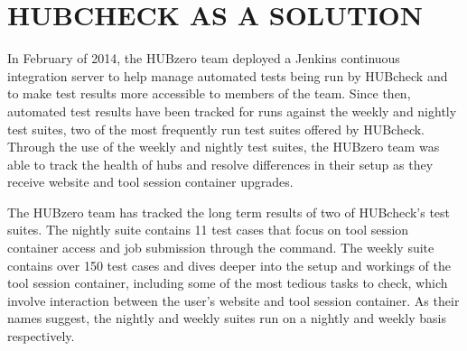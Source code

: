 



\chapter{HUBCHECK AS A SOLUTION}
\label{chap:solution}

In February of 2014, the HUBzero team deployed a Jenkins
\cite{Jenkins:2015:Online} continuous integration server to help manage
automated tests being run by HUBcheck and to make test results more accessible
to members of the team. Since then, automated test results have been tracked
for runs against the weekly and nightly test suites, two of the most frequently run test
suites offered by HUBcheck. Through the use of the weekly and nightly test
suites, the HUBzero team was able to track the health of hubs and resolve
differences in their setup as they receive website and tool session container
upgrades.

The HUBzero team has tracked the long term results of two of HUBcheck's test
suites. The nightly suite contains 11 test cases that focus on tool session
container access and job submission through the  command. The
weekly suite contains over 150 test cases and dives deeper into the setup and
workings of the tool session container, including some of the most tedious
tasks to check, which involve interaction between the user's website and tool
session container. As their names suggest, the nightly and weekly suites run on
a nightly and weekly basis respectively.

